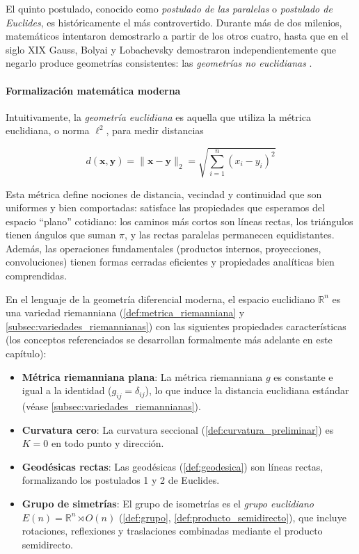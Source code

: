El quinto postulado, conocido como \textit{postulado de las paralelas} o \textit{postulado de Euclides}, es históricamente el más controvertido. Durante más de dos milenios, matemáticos intentaron demostrarlo a partir de los otros cuatro, hasta que en el siglo XIX Gauss, Bolyai y Lobachevsky demostraron independientemente que negarlo produce geometrías consistentes: las \textit{geometrías no euclidianas} \citep{gray2007worlds}.

\paragraph{Formalización matemática moderna}

Intuitivamente, la \textit{geometría euclidiana} es aquella que utiliza la métrica euclidiana, o norma $\ell^2$, para medir distancias

\[
d(\mathbf{x}, \mathbf{y}) = \|\mathbf{x} - \mathbf{y}\|_2 = \sqrt{\sum_{i=1}^n (x_i - y_i)^2}
\]

Esta métrica define nociones de distancia, vecindad y continuidad que son uniformes y bien comportadas: satisface las propiedades que esperamos del espacio ``plano'' cotidiano: los caminos más cortos son líneas rectas, los triángulos tienen ángulos que suman $\pi$, y las rectas paralelas permanecen equidistantes. Además, las operaciones fundamentales (productos internos, proyecciones, convoluciones) tienen formas cerradas eficientes y propiedades analíticas bien comprendidas.

En el lenguaje de la geometría diferencial moderna, el espacio euclidiano $\mathbb{R}^n$ es una variedad riemanniana (\autoref{def:metrica_riemanniana} y \autoref{subsec:variedades_riemannianas}) con las siguientes propiedades características (los conceptos referenciados se desarrollan formalmente más adelante en este capítulo):

\begin{itemize}
    \item \textbf{Métrica riemanniana plana}: La métrica riemanniana $g$ es constante e igual a la identidad ($g_{ij} = \delta_{ij}$), lo que induce la distancia euclidiana estándar (véase \autoref{subsec:variedades_riemannianas}).
    \item \textbf{Curvatura cero}: La curvatura seccional (\autoref{def:curvatura_preliminar}) es $K = 0$ en todo punto y dirección.
    \item \textbf{Geodésicas rectas}: Las geodésicas (\autoref{def:geodesica}) son líneas rectas, formalizando los postulados 1 y 2 de Euclides.
    \item \textbf{Grupo de simetrías}: El grupo de isometrías es el \textit{grupo euclidiano} $E(n) = \mathbb{R}^n \rtimes O(n)$ (\autoref{def:grupo}, \autoref{def:producto_semidirecto}), que incluye rotaciones, reflexiones y traslaciones combinadas mediante el producto semidirecto.
\end{itemize}

